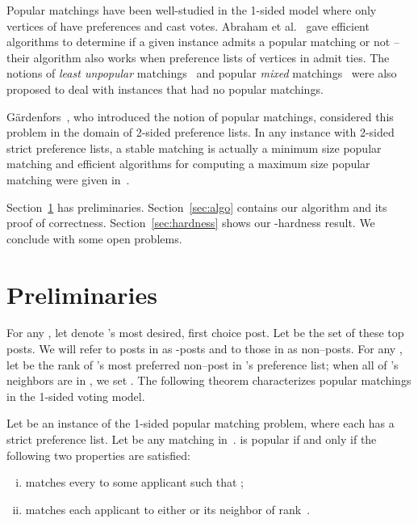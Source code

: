 \documentclass[11pt]{llncs}
\begin{document}
\medskip

 Popular matchings have been well-studied in the 1-sided model 
\cite{AIKM05,KN08,Mah06,MS06,MI09,Mes06} where only vertices of  have preferences and cast votes. 
Abraham et al.~\cite{AIKM05} gave efficient algorithms to determine if a given instance admits a 
popular matching or not -- their algorithm also works when preference lists of vertices in  admit ties. 
The notions of {\em least unpopular} matchings~\cite{McC06} and popular {\em mixed} matchings~\cite{KMN09} 
were also proposed to deal with instances that had no popular matchings.

G\"ardenfors~\cite{Gar75}, who introduced the notion of popular matchings, considered
this problem in the domain of 2-sided preference lists. In any instance  
with 2-sided strict preference lists, a stable matching is actually a minimum size popular matching
and efficient algorithms for computing a maximum size popular matching were given in~\cite{HK11,Kav12}. 

\medskip

 Section~\ref{sec:prelims} has preliminaries.
Section~\ref{sec:algo} contains our algorithm and its proof of correctness. Section~\ref{sec:hardness}
shows our -hardness result. We conclude with some open problems.

\section{Preliminaries}
\label{sec:prelims}

For any , let  denote 's most desired, first choice post. Let  be the set of these top posts. We will refer to posts in  as -posts and to those in 
 as non--posts. For any , let  be the rank of 's most 
preferred non--post in 's preference list; when all of 's neighbors are in , we 
set . The following theorem characterizes popular matchings in the 
1-sided voting model. 
\begin{theorem}
\label{thm1}
Let  be an instance of the 1-sided popular matching problem, where each 
 has a strict preference list.
Let  be any matching in~.  is popular if and only if the following two properties are 
satisfied:
\begin{enumerate} [(i)]
\item  matches every  to some applicant  such that ;
\item  matches each applicant  to either  or its neighbor of rank~.
\end{enumerate}
\end{theorem}
\end{document}
